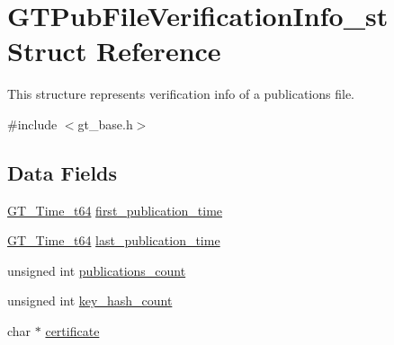 \hypertarget{struct_g_t_pub_file_verification_info__st}{
\section{GTPubFileVerificationInfo\_\-st Struct Reference}
\label{struct_g_t_pub_file_verification_info__st}
}


This structure represents verification info of a publications file.  




{\ttfamily \#include $<$gt\_\-base.h$>$}

\subsection*{Data Fields}
\begin{DoxyCompactItemize}
\item 
\hyperlink{group__common_ga4cc54826c21e0ed438d8e35be7039328}{GT\_\-Time\_\-t64} \hyperlink{struct_g_t_pub_file_verification_info__st_a324d8a712dc8c6e6e88a16e82bfd21bc}{first\_\-publication\_\-time}
\item 
\hyperlink{group__common_ga4cc54826c21e0ed438d8e35be7039328}{GT\_\-Time\_\-t64} \hyperlink{struct_g_t_pub_file_verification_info__st_ad850cc69e0c80addc2b113c326e463b6}{last\_\-publication\_\-time}
\item 
unsigned int \hyperlink{struct_g_t_pub_file_verification_info__st_aa49831cefc4796c3eeb930b6ac287940}{publications\_\-count}
\item 
unsigned int \hyperlink{struct_g_t_pub_file_verification_info__st_ad0973ea431df05550a660dfb71033728}{key\_\-hash\_\-count}
\item 
char $\ast$ \hyperlink{struct_g_t_pub_file_verification_info__st_a341f7aa579f402725c9b0bff9b0dd3a1}{certificate}
\end{DoxyCompactItemize}


